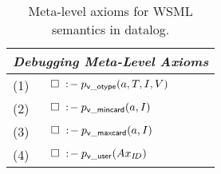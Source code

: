 \begin{table}[tb]\label{tab:debugging-axioms}\centering
\begin{small}
\begin{tabular}{|ll|}
  \hline
  \multicolumn{2}{|l|}{\rule{0cm}{3.2mm}{\normalsize \emph{Debugging Meta-Level Axioms}}} \\
  \hline
  (1) & $\square\;:\!-\: p_{\mathrm{\sf v\_otype}}(a,T,I,V)$ \\
  (2) & $\square\;:\!-\: p_{\mathrm{\sf v\_mincard}}(a,I)$ \\
  (3) & $\square\;:\!-\: p_{\mathrm{\sf v\_maxcard}}(a,I)$ \\
  (4) & $\square\;:\!-\: p_{\mathrm{\sf v\_user}}(Ax_{I\!D})$ \\
 \hline
\end{tabular}
\end{small} \caption{Meta-level axioms for WSML semantics in
datalog.}
\end{table}
